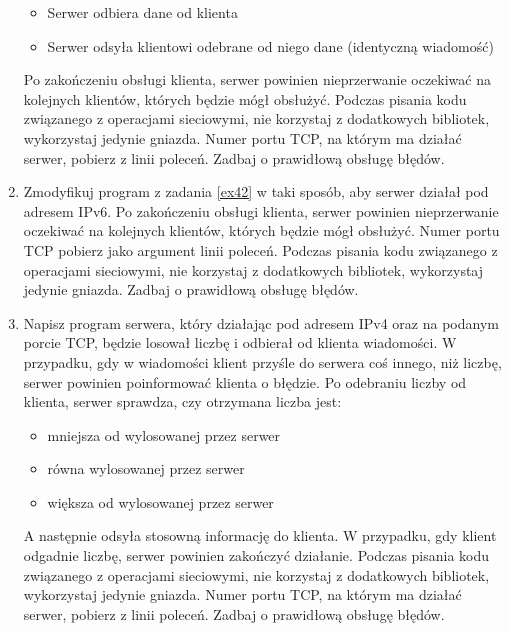 \documentclass{article}
\begin{document}
\begin{enumerate}[label=\textbf{4.\arabic*}]
\begin{itemize}
\item Serwer odbiera dane od klienta
\item Serwer odsyła klientowi odebrane od niego dane (identyczną wiadomość) 
\end{itemize}

\noindent Po zakończeniu obsługi klienta, serwer powinien nieprzerwanie oczekiwać na kolejnych klientów, których będzie mógł obsłużyć. Podczas pisania kodu związanego z operacjami sieciowymi, nie korzystaj z dodatkowych bibliotek, wykorzystaj jedynie gniazda. Numer portu TCP, na którym ma działać serwer, pobierz z linii poleceń. Zadbaj o prawidłową obsługę błędów. 

\item Zmodyfikuj program z zadania \ref{ex42} w taki sposób,  aby serwer działał pod adresem IPv6. Po zakończeniu obsługi klienta, serwer powinien nieprzerwanie oczekiwać na kolejnych klientów, których będzie mógł obsłużyć. Numer portu TCP pobierz jako argument linii poleceń. Podczas pisania kodu związanego z operacjami sieciowymi, nie korzystaj z dodatkowych bibliotek, wykorzystaj jedynie gniazda. Zadbaj o prawidłową obsługę błędów. 

\item \label{ex45} Napisz program serwera, który działając  pod adresem IPv4 oraz na podanym porcie TCP, będzie losował liczbę i odbierał od klienta wiadomości. W przypadku, gdy w wiadomości klient przyśle do serwera coś innego, niż liczbę, serwer powinien poinformować klienta o błędzie. Po odebraniu liczby od klienta, serwer sprawdza, czy otrzymana liczba jest:

\begin{itemize}
\item mniejsza od wylosowanej przez serwer
\item równa wylosowanej przez serwer
\item większa od wylosowanej przez serwer
\end{itemize} 

\noindent A następnie odsyła stosowną informację do klienta. W przypadku, gdy klient odgadnie liczbę, serwer powinien zakończyć działanie.   Podczas pisania kodu związanego z operacjami sieciowymi, nie korzystaj z dodatkowych bibliotek, wykorzystaj jedynie gniazda. Numer portu TCP, na którym ma działać serwer, pobierz z linii poleceń. Zadbaj o prawidłową obsługę błędów. 


\end{enumerate}
\end{document}
